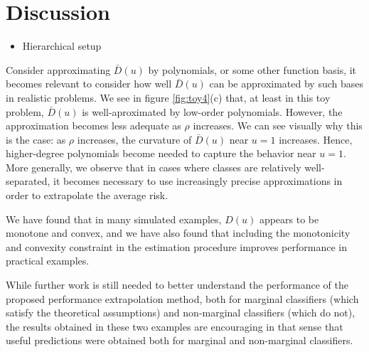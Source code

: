 \documentclass[twoside,11pt]{article}
\begin{document}
\section{Discussion}

\begin{itemize}
\item Hierarchical setup
\end{itemize}

Consider approximating
$\bar{D}(u)$ by polynomials, or some other function basis, it becomes
relevant to consider how well $\bar{D}(u)$ can be approximated by such
bases in realistic problems.  We see in figure \ref{fig:toy4}(c) that,
at least in this toy problem, $\bar{D}(u)$ is well-aproximated by
low-order polynomials.  However, the approximation becomes less
adequate as $\rho$ increases.  We can see visually why this is the
case: as $\rho$ increases, the curvature of $\bar{D}(u)$ near $u = 1$
increases.  Hence, higher-degree polynomials become needed to capture
the behavior near $u = 1$.  More generally, we observe that in cases
where classes are relatively well-separated, it becomes necessary to
use increasingly precise approximations in order to extrapolate the
average risk.

 We
have found that in many simulated examples, $D(u)$ appears to be
monotone and convex, and we have also found that including the
monotonicity and convexity constraint in the estimation procedure
improves performance in practical examples.


While further work is still needed to better understand the
performance of the proposed performance extrapolation method, both for
marginal classifiers (which satisfy the theoretical assumptions) and
non-marginal classifiers (which do not), the results obtained in these
two examples are encouraging in that sense that useful predictions
were obtained both for marginal and non-marginal classifiers.



\end{document}
